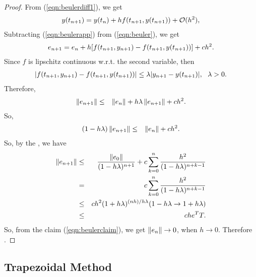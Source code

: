 \documentclass[12pt]  {article}%
\begin{document}
\begin{proof}
From (\ref{eqn:beulerdiff1}), we get
 \begin{eqnarray}\label{eqn:beulerapp}
 y(t_{n+1})=y(t_n)+h f(t_{n+1},y(t_{n+1}))+\mathcal{O}{(h^2)},
 \end{eqnarray}
Subtracting (\ref{eqn:beulerapp}) from (\ref{eqn:beuler}), we get
 \begin{eqnarray}
  e_{n+1}=e_{n}+h [f(t_{n+1},y_{n+1})-f(t_{n+1},y(t_{n+1}))]+ch^2.
\end{eqnarray}
Since $f$ is lipschitz continuous w.r.t. the second variable, then
 \begin{eqnarray}
|f(t_{n+1},y_{n+1})-f(t_{n+1},y(t_{n+1}))| \leq \lambda |y_{n+1}-y(t_{n+1})|,~~\lambda>0.
\end{eqnarray}
Therefore,
 \begin{eqnarray}
 \left\|e_{n+1}\right\|&\leq& \left\|e_n\right\|+h\lambda\left\|e_{n+1}\right\|+ch^2.
\end{eqnarray}
So,
 \begin{eqnarray}
 (1-h\lambda)\left\|e_{n+1}\right\|&\leq& \left\|e_n\right\|+ch^2.
\end{eqnarray}
So, by the , we have
\begin{eqnarray}\label{eqn:beulerclaim}
\left\|e_{n+1}\right\| &\leq& \frac{\left\|e_0\right\|}{(1-h\lambda)^{n+1}}+c\sum_{k=0}^{n}\frac{h^2}{(1-h\lambda)^{n+k-1}}\nonumber\\
&=&c\sum_{k=0}^{n}\frac{h^2}{(1-h\lambda)^{n+k-1}}\\
&\leq& ch^2(1+h\lambda)^{(nh)/h\lambda}(1-h\lambda\to 1+h\lambda)\nonumber\\
&\leq&ch e^T T\nonumber.
\end{eqnarray}
So, from the claim (\ref{eqn:beulerclaim}), we get $\left\|e_n\right\|\to 0$, when $h\to 0$. Therefore
.
\end{proof}


\subsection{Trapezoidal Method}
\end{document}
